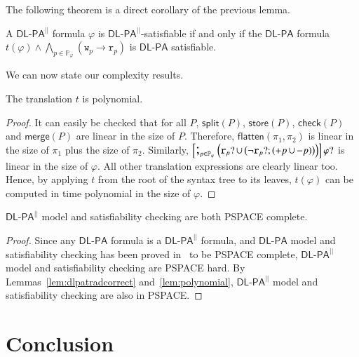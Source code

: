 \documentclass{llncs}
\newcommand{\progStore}{\mathsf{store}}
\newcommand{\progOkChange}{\mathsf{check}}
\newcommand{\progsplit}{\mathsf{split}}
\newcommand{\progmerge}{\mathsf{merge}}
\newcommand{\progFlatten}{\mathsf{flatten}}
\newcommand{\pll}{ {||} }							%
\newcommand{\readable}[1]{\mathtt{r}_{#1}}
\newcommand{\writable}[1]{\mathtt{w}_{#1}}
\newcommand{\testpdl}{?}				%
\newcommand{\Dlpa}{\ensuremath{\mathsf{DL\text{-}PA}}\xspace}
\newcommand{\DlpaPll}{\ensuremath{\mathsf{DL\text{-}PA}^\pll}\xspace}
\newcommand{\assgntopV}[1]{{\mathtt {+} #1}}
\newcommand{\assgnbotV}[1]{{\mathtt {-} #1}}
\newcommand{\limp}{ \rightarrow }
\newcommand{\ndet}{\,{\cup}\,}
\renewcommand{\phi}{\varphi}
\newcommand{\propset}{\mathbb P}
\newcommand{\propsetOf}[1]{\propset_{#1}}
\newcommand{\seqseq}[1]{ \text{\Large ;}_{#1} ~ }
\begin{document}
The following theorem is a direct corollary of the previous lemma.

\begin{theorem}
A \DlpaPll formula $\phi$ is \DlpaPll-satisfiable if and only if the \Dlpa formula
$t(\phi) \land \bigwedge_{p \in \propsetOf \phi } (\writable{p} \limp \readable p)$ 
is \Dlpa satisfiable.
\end{theorem}

We can now state our complexity results.

\begin{lemma}\label{lem:polynomial}
The translation $t$ is polynomial.
\end{lemma}
\begin{proof}
It can easily be checked that for all $P$, $\progsplit(P)$, $\progStore(P)$, $\progOkChange(P)$ and $\progmerge(P)$ are linear in the size of $P$.
Therefore, $\progFlatten(\pi_1, \pi_2)$ is linear in the size of $\pi_1$ plus the size of $\pi_2$.
Similarly, 
$\left[\seqseq{p \in \propsetOf \phi} \Big(
\readable{p} \testpdl \ndet \big( \lnot \readable{p} \testpdl ; (\assgntopV{p} \ndet \assgnbotV{p}) \big) 
\Big)\right] \phi \testpdl $ is linear in the size of $\phi$.
All other translation expressions are clearly linear too.
Hence, by applying $t$ from the root of the syntax tree to its leaves, $t(\phi)$ can be computed in time polynomial in the size of $\phi$.
\end{proof}

\begin{theorem}
\DlpaPll model and satisfiability checking are both PSPACE complete.
\end{theorem}
\begin{proof}
Since any \Dlpa formula is a \DlpaPll formula, and \Dlpa model and satisfiability checking has been proved in~\cite{BalbianiHST14} to be PSPACE complete,
\DlpaPll model and satisfiability checking are PSPACE hard.
By Lemmas~\ref{lem:dlpatradcorrect} and~\ref{lem:polynomial}, \DlpaPll model and satisfiability checking are also in PSPACE.
\end{proof}

\section{Conclusion}\label{sec:conclusion}
\end{document}
